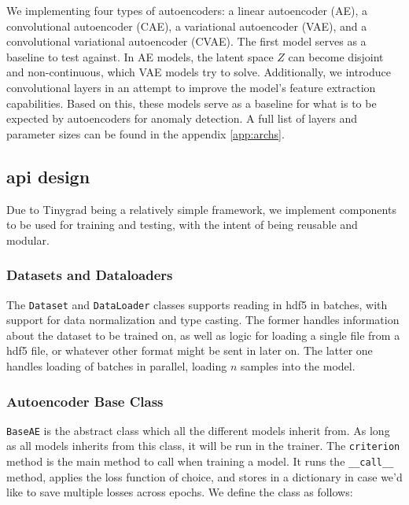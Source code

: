 We implementing four types of autoencoders: a linear autoencoder (AE), a convolutional autoencoder (CAE), a variational autoencoder (VAE), and a convolutional variational autoencoder (CVAE). The first model serves as a baseline to test against. In AE models, the latent space $Z$ can become disjoint and non-continuous, which VAE models try to solve. Additionally, we introduce convolutional layers in an attempt to improve the model's feature extraction capabilities. Based on this, these models serve as a baseline for what is to be expected by autoencoders for anomaly detection. A full list of layers and parameter sizes can be found in the appendix \ref{app:archs}. \\

\subsection{\acrshort{api} design}

Due to Tinygrad being a relatively simple framework, we implement components to be used for training and testing, with the intent of being reusable and modular.

\subsubsection{Datasets and Dataloaders}

The \texttt{Dataset} and \texttt{DataLoader} classes supports reading in \acrshort{hdf5} in batches, with support for data normalization and type casting. The former handles information about the dataset to be trained on, as well as logic for loading a single file from a \acrshort{hdf5} file, or whatever other format might be sent in later on. The latter one handles loading of batches in parallel, loading $n$ samples into the model.

\subsubsection{Autoencoder Base Class}

\lstinline{BaseAE} is the abstract class which all the different models inherit from. As long as all models inherits from this class, it will be run in the trainer. The \lstinline{criterion} method is the main method to call when training a model. It runs the \lstinline{__call__} method, applies the loss function of choice, and stores in a dictionary in case we'd like to save multiple losses across epochs. We define the class as follows:

